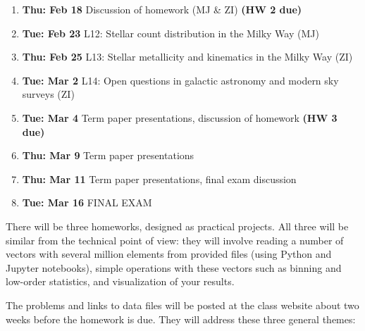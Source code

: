 \documentclass[10pt]{article}
\begin{document}
\begin{enumerate}
  \item {\bf Thu: Feb 18}  Discussion of homework  (MJ \& ZI) {\bf (HW 2 due)}

  \item {\bf Tue: Feb 23}  L12: Stellar count distribution in the Milky Way (MJ)

  \item {\bf Thu: Feb 25}  L13: Stellar metallicity and kinematics in the Milky Way (ZI) 

  \item {\bf Tue: Mar 2}  L14: Open questions in galactic astronomy and modern sky surveys (ZI) 

  \item {\bf Tue: Mar 4}     Term paper presentations, discussion of homework   {\bf (HW 3 due)}
  \item {\bf Thu: Mar 9}     Term paper presentations   
  \item {\bf Thu: Mar 11}   Term paper presentations, final exam discussion 
  \item {\bf Tue: Mar 16} FINAL EXAM
\end{enumerate}


\vskip 0.2in


There will be three homeworks, designed as practical projects. All three will be similar
from the technical point of view: they will involve reading a number of vectors with several 
million elements from provided files (using Python and Jupyter notebooks), simple operations 
with these vectors such as binning and low-order statistics, and visualization of your results. 

The problems and links to data files will be posted at the class website about two weeks 
before the homework is due. They will address these three general themes:
\end{document}
